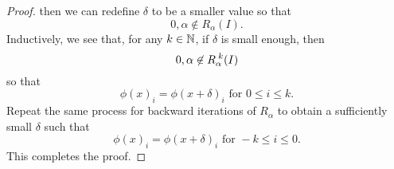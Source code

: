 \documentclass[10pt,twoside,draft]{book}
\begin{document}
\begin{example}
\begin{lemma}
\begin{proof}
  then we can redefine $\delta$ to be a smaller value so that 
  \begin{equation*} 
    0, \alpha \not\in R_\alpha(I).
  \end{equation*}
  Inductively, we see that, for any $k \in \mathbb{N}$, if $\delta$ is small enough, then 
  \begin{equation*}
    0, \alpha \not\in R_\alpha^{\;k}(I)
  \end{equation*}
  so that
  \begin{equation*}
    \phi(x)_i = \phi(x+\delta)_i \mbox{ for } 0 \leq i \leq k.
  \end{equation*}
  Repeat the same process for backward iterations of $R_\alpha$ to obtain a sufficiently small $\delta$ such that
  \begin{equation*}
    \phi(x)_i = \phi(x+\delta)_i \mbox{ for } -k \leq i \leq 0.
  \end{equation*}
  This completes the proof.
\end{proof}
  \end{lemma}


\end{example}
\end{document}

